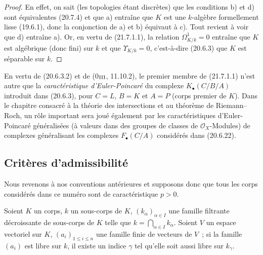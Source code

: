 \begin{proof}
En effet, on sait (les topologies étant discrètes) que les conditions b) et
d) sont équivalentes (20.7.4) et que a) entraîne que $K$ est une
$k$-algèbre formellement lisse (19.6.1), donc la conjonction de a) et b)
équivaut à c). Tout revient à voir que d) entraîne a). Or, en vertu de
(21.7.1.1), la relation $\Omega^1_{K/k}=0$ entraîne que $K$ est algébrique
(donc fini) sur $k$ et que $\Upsilon_{K/k}=0$, c'est-à-dire (20.6.3) que
$K$ est séparable sur $k$.
\end{proof}

\begin{remark}[21.7.5]
\label{0.21.7.5-fr}
En vertu de (20.6.3.2) et de (0$_{\rm III}$, 11.10.2), le premier membre de
(21.7.1.1) n'est autre que la \emph{caractéristique d'Euler-Poincaré} du
complexe $K_\bullet(C/B/A)$ introduit dans (20.6.3), pour $C=L$, $B=K$ et
$A=P$ (corps premier de $K$). Dans le chapitre consacré à la théorie des
intersections et au théorème de Riemann--Roch, un rôle important sera joué
également par les caractéristiques d'Euler-Poincaré généralisées (à valeurs
dans des groupes de classes de $\mathcal O_X$-Modules) de complexes
généralisant les complexes $F_\bullet(C/A)$ considérés dans (20.6.22).
\end{remark}

\subsection{Critères d'admissibilité}
\label{subsection:0.21.8-fr}

Nous revenons à nos conventions antérieures et supposons donc que tous les
corps considérés dans ce numéro sont de caractéristique $p>0$.

\begin{lemma}[21.8.1]
\label{0.21.8.1-fr}
Soient $K$ un corps, $k$ un sous-corps de $K$, $(k_\alpha)_{\alpha\in I}$ une
famille filtrante décroissante de sous-corps de $K$ telle que
$k=\bigcap_{\alpha\in I}k_\alpha$. Soient $V$ un espace vectoriel sur $K$,
$(a_i)_{1\leqslant i\leqslant n}$ une famille finie de vecteurs de $V$~; si la
famille $(a_i)$ est libre sur $k$, il existe un indice $\gamma$ tel qu'elle
soit aussi libre sur $k_\gamma$.
\end{lemma}

